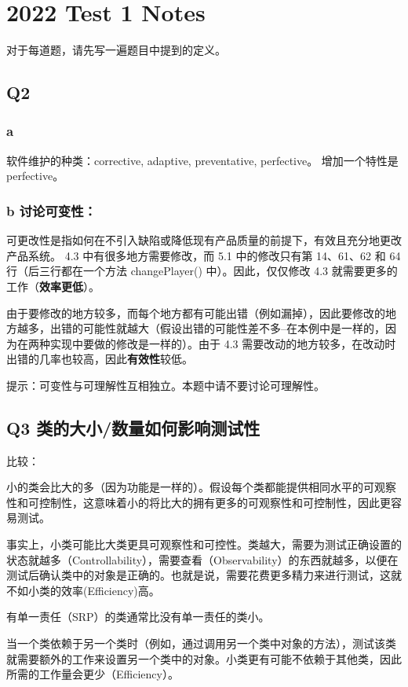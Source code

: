 \section{2022 Test 1 Notes}

对于每道题，请先写一遍题目中提到的定义。

\subsection{Q2}
\subsubsection{a}
软件维护的种类：corrective, adaptive, preventative, perfective。
增加一个特性是perfective。
\subsubsection{b 讨论可变性：}
可更改性是指如何在不引入缺陷或降低现有产品质量的前提下，有效且充分地更改产品系统。
4.3 中有很多地方需要修改，而 5.1 中的修改只有第 14、61、62 和 64 行（后三行都在一个方法 changePlayer() 中）。因此，仅仅修改 4.3 就需要更多的工作（\textbf{效率更低}）。

由于要修改的地方较多，而每个地方都有可能出错（例如漏掉），因此要修改的地方越多，出错的可能性就越大（假设出错的可能性差不多--在本例中是一样的，因为在两种实现中要做的修改是一样的）。由于 4.3 需要改动的地方较多，在改动时出错的几率也较高，因此\textbf{有效性}较低。

提示：可变性与可理解性互相独立。本题中请不要讨论可理解性。

\subsection{Q3 类的大小/数量如何影响测试性}
比较：

小的类会比大的多（因为功能是一样的）。假设每个类都能提供相同水平的可观察性和可控制性，这意味着小的将比大的拥有更多的可观察性和可控制性，因此更容易测试。

事实上，小类可能比大类更具可观察性和可控性。类越大，需要为测试正确设置的状态就越多（Controllability），需要查看（Observability）的东西就越多，以便在测试后确认类中的对象是正确的。也就是说，需要花费更多精力来进行测试，这就不如小类的效率(Efficiency)高。

有单一责任（SRP）的类通常比没有单一责任的类小。

当一个类依赖于另一个类时（例如，通过调用另一个类中对象的方法），测试该类就需要额外的工作来设置另一个类中的对象。小类更有可能不依赖于其他类，因此所需的工作量会更少（Efficiency）。

